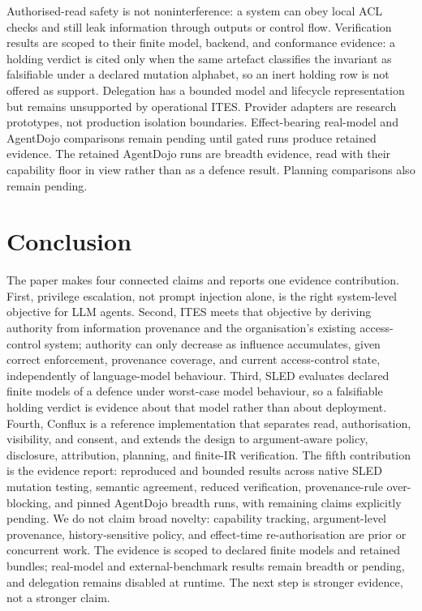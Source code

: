 \documentclass[11pt]{article}
\begin{document}
Authorised-read safety is not noninterference: a system can obey local ACL
checks and still leak information through outputs or control flow. Verification
results are scoped to their finite model, backend, and conformance
evidence: a holding verdict is cited only when the same artefact classifies
the invariant as falsifiable under a declared mutation alphabet, so an
inert holding row is not offered as support. Delegation has a bounded model
and lifecycle representation but remains unsupported by operational ITES.
Provider adapters are research prototypes, not production isolation
boundaries. Effect-bearing real-model and AgentDojo comparisons remain pending
until gated runs produce retained evidence. The retained AgentDojo runs are
breadth evidence, read with their capability floor in view rather than as a
defence result. Planning comparisons also remain pending.


\section{Conclusion}

The paper makes four connected claims and reports one evidence contribution.
First, privilege escalation, not prompt injection alone, is the right
system-level objective for LLM agents. Second, ITES meets that objective by
deriving authority from information provenance and the organisation's existing
access-control system; authority can only decrease as influence accumulates,
given correct enforcement, provenance coverage, and current access-control
state, independently of language-model behaviour. Third, SLED evaluates
declared finite models of a defence under worst-case model behaviour, so a
falsifiable holding verdict is evidence about that model rather than about
deployment. Fourth, Conflux is a reference
implementation that separates read, authorisation, visibility, and consent,
and extends the design to argument-aware policy, disclosure, attribution,
planning, and finite-IR verification. The fifth contribution is the evidence
report: reproduced and bounded results across native SLED mutation testing,
semantic agreement, reduced verification, provenance-rule over-blocking, and
pinned AgentDojo breadth runs, with remaining claims explicitly pending. We do not claim broad
novelty: capability tracking, argument-level provenance, history-sensitive
policy, and effect-time re-authorisation are prior or concurrent work. The evidence is scoped to declared finite models and retained
bundles; real-model and external-benchmark results remain breadth or pending,
and delegation remains disabled at runtime. The next step is stronger
evidence, not a stronger claim.




\end{document}
